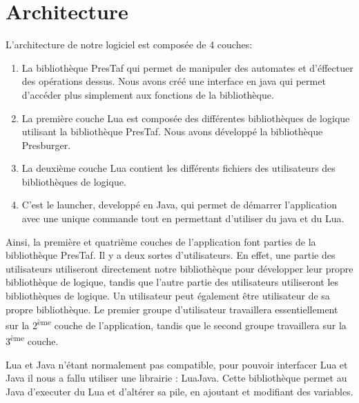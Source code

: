 \section{Architecture}

L'architecture de notre logiciel est composée de 4 couches:
\begin{enumerate}
	\item La bibliothèque PresTaf qui permet de manipuler des automates et d'éffectuer des opérations dessus. Nous avons créé une interface en java qui permet d'accéder plus simplement aux fonctions de la bibliothèque.
	\item La première couche Lua est composée des différentes bibliothèques de logique utilisant la bibliothèque PresTaf. Nous avons développé la bibliothèque Presburger.
	\item La deuxième couche Lua contient les différents fichiers des utilisateurs des bibliothèques de logique.
	\item C'est le launcher, developpé en Java, qui permet de démarrer l'application avec une unique commande tout en permettant d'utiliser du java et du Lua.
\end{enumerate}

Ainsi, la première et quatrième couches de l'application font parties de la bibliothèque PresTaf. Il y a deux sortes d'utilisateurs. En effet, une partie des utilisateurs utiliseront directement notre bibliothèque pour développer leur propre bibliothèque de logique, tandis que l'autre partie des utilisateurs utiliseront les bibliothèques de logique. Un utilisateur peut également être utilisateur de sa propre bibliothèque. Le premier groupe d'utilisateur travaillera essentiellement sur la 2\textsuperscript{ème} couche de l'application, tandis que le second groupe travaillera sur la 3\textsuperscript{ème} couche.\\\par

Lua et Java n'étant normalement pas compatible, pour pouvoir interfacer Lua et Java il nous a fallu utiliser une librairie : LuaJava. Cette bibliothèque permet au Java d'executer du Lua et d'altérer sa pile, en ajoutant et modifiant des variables.\\

